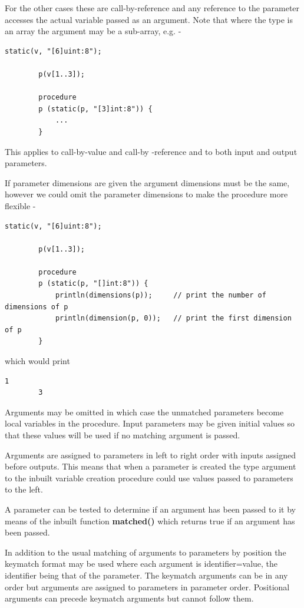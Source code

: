 \documentclass[10pt,a4paper,twoside,fleqn]{article}
\newcommand{\kwd}[1]{{\bf #1}} %
\begin{document}
    For the other cases these are call-by-reference and any reference to the
    parameter accesses the actual variable passed as an argument. Note that
    where the type is an array the argument may be a sub-array,
    e.g. -
    \begin{lstlisting}[language=threepl]
        static(v, "[6]uint:8");
        
        p(v[1..3]);
        
        procedure
        p (static(p, "[3]int:8")) {
            ...
        }
    \end{lstlisting}
    This applies to call-by-value and call-by -reference and to both input and
    output parameters.

    If parameter dimensions are given the argument dimensions must be the same,
    however we could omit the parameter dimensions to make the procedure more
    flexible -
    \begin{lstlisting}[language=threepl]
        static(v, "[6]uint:8");
        
        p(v[1..3]);
        
        procedure
        p (static(p, "[]int:8")) {
            println(dimensions(p));     // print the number of dimensions of p
            println(dimension(p, 0));   // print the first dimension of p
        }
    \end{lstlisting}
    which would print
    \begin{lstlisting}[language=threepl]
        1
        3
    \end{lstlisting}
    
    Arguments may be omitted in which case the unmatched parameters become
    local variables in the procedure. Input parameters may be given initial values
    so that these values will be used if no matching argument is passed.
    
    Arguments are assigned to parameters in left to right order with inputs
    assigned before outputs. This means that when a parameter is created
    the type argument to the inbuilt variable creation procedure could use
    values passed to parameters to the left.
    
    A parameter can be tested to determine if an argument has been passed to it by
    means of the inbuilt function \kwd{matched()} which returns true if an argument
    has been passed.
    
    In addition to the usual matching of arguments to parameters by position
    the keymatch format may be used where each argument is identifier=value,
    the identifier being that of the parameter. The keymatch arguments can be
    in any order but arguments are assigned to parameters in parameter order.
    Positional arguments can precede keymatch arguments but cannot follow them.
    
\end{document}
